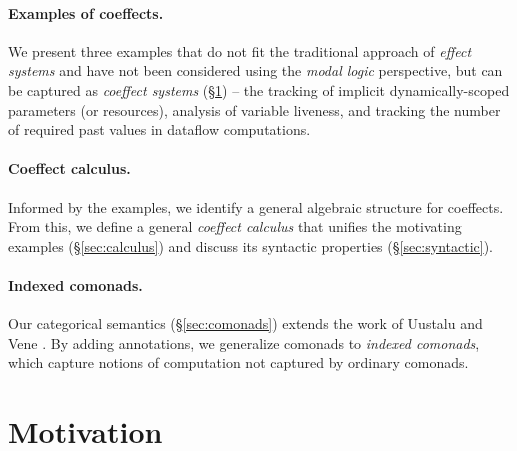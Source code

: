 \paragraph{Examples of coeffects.}
We present three examples that do not fit the traditional approach of
\emph{effect systems} and have not been considered using the \emph{modal logic}
perspective, but can be captured as \emph{coeffect systems} (\S\ref{sec:motivation}) --
the tracking of implicit dynamically-scoped parameters (or resources),
analysis of variable liveness, and tracking the
number of required past values in dataflow computations.

\paragraph{Coeffect calculus.}
Informed by the examples, we identify a general algebraic structure for coeffects. 
From this, we define a general \emph{coeffect calculus} that unifies the motivating 
examples (\S\ref{sec:calculus}) and discuss its syntactic properties (\S\ref{sec:syntactic}). 

\paragraph{Indexed comonads.}
Our categorical semantics (\S\ref{sec:comonads}) extends the work of Uustalu and Vene 
\cite{comonads-notions}. By adding annotations, we generalize comonads to \emph{indexed comonads}, 
which capture notions of computation not captured by ordinary comonads.


\section{Motivation}
\label{sec:motivation}

